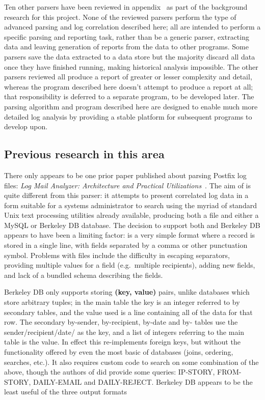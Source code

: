 Ten other parsers have been reviewed in
appendix~ as part of the background research for
this project.  None of the reviewed parsers perform the type of advanced
parsing and log correlation described here; all are intended to perform a
specific parsing and reporting task, rather than be a generic parser,
extracting data and leaving generation of reports from the data to other
programs.  Some parsers save the data extracted to a data store but the
majority discard all data once they have finished running, making
historical analysis impossible.  The other parsers reviewed all produce a
report of greater or lesser complexity and detail, whereas the program
described here doesn't attempt to produce a report at all; that
responsibility is deferred to a separate program, to be developed later.
The parsing algorithm and program described here are designed to enable
much more detailed log analysis by providing a stable platform for
subsequent programs to develop upon.



\subsection{Previous research in this area}

\label{prior art}

There only appears to be one prior paper published about parsing Postfix
log files: \textit{Log Mail Analyzer: Architecture and Practical
Utilizations\/}~\cite{log-mail-analyser}.  The aim of \LMA{} is quite
different from this parser: it attempts to present correlated log data in a
form suitable for a systems administrator to search using the myriad of
standard Unix text processing utilities already available, producing both a
\CSV{} file and either a MySQL or Berkeley DB database.  The decision to
support both \CSV{} and Berkeley DB appears to have been a limiting factor:
\CSV{} is a very simple format where a record is stored in a single line,
with fields separated by a comma or other punctuation symbol.  Problems
with \CSV{} files include the difficulty in escaping separators, providing
multiple values for a field (e.g.\ multiple recipients), adding new fields,
and lack of a bundled schema describing the fields.

Berkeley DB only supports storing \textbf{(key, value)} pairs, unlike
\SQL{} databases which store arbitrary tuples; in the main table the key is
an integer referred to by secondary tables, and the value used is a \CSV{}
line containing all of the data for that row.  The secondary by-sender,
by-recipient, by-date and by-\IP{} tables use the
sender/recipient/date/\IP{} as the key, and a \CSV{} list of integers
referring to the main table is the value.  In effect this re-implements
\SQL{} foreign keys, but without the functionality offered by even the most
basic of \SQL{} databases (joins, ordering, searches, etc.).  It also
requires custom code to search on some combination of the above, though the
authors of \LMA{} did provide some queries: IP-STORY, FROM-STORY,
DAILY-EMAIL and DAILY-REJECT\@.  Berkeley DB appears to be the least useful
of the three output formats

